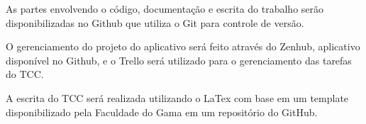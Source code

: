 As partes envolvendo o código, documentação e escrita do trabalho serão disponibilizadas 
no Github que utiliza o Git para controle de versão.

O gerenciamento do projeto do aplicativo será feito através do Zenhub, aplicativo disponível no Github, e o Trello será utilizado para o gerenciamento das tarefas do TCC. 

A escrita do TCC será realizada utilizando o LaTex com base em um template 
disponibilizado pela Faculdade do Gama em um repositório do GitHub. 

